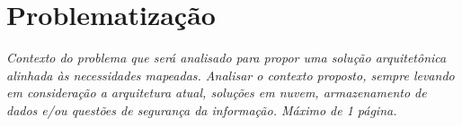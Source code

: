 \section{Problematização}

\textit{Contexto do problema que será analisado para propor uma solução arquitetônica alinhada às necessidades mapeadas. Analisar o contexto proposto, sempre levando em consideração a arquitetura atual, soluções em nuvem, armazenamento de dados e/ou questões de segurança da informação. Máximo de 1 página.}
